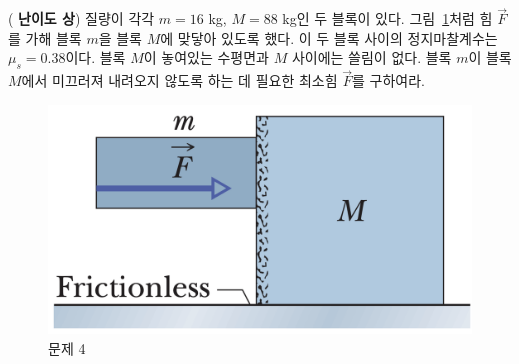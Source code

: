 \documentclass[floatfix,nofootinbib,superscriptaddress,fleqn,preprint]{revtex4}
\begin{document}
\vspace{2cm}

 (\textbf{\color{red} 난이도 상})
질량이 각각 $m=16$ kg, $M=88$ kg인 두 블록이 
있다. 그림~\ref{fig:4}처럼 힘 $\vec{F}$를 가해 블록 $m$을 블록 $M$에
맞닿아 있도록 했다. 이 두 블록 사이의 정지마찰계수는
$\mu_s=0.38$이다. 블록 $M$이 놓여있는 수평면과 $M$ 사이에는 쓸림이
없다.  블록 $m$이 블록 $M$에서 미끄러져 내려오지 않도록 하는 데 필요한
최소힘 $\vec{F}$를 구하여라. 
\begin{figure}[ht]
  \centering
\includegraphics[scale=0.3]{Qfig6-4-20220321.png}  
  \caption{문제 4}
  \label{fig:4}
\end{figure}\\
\end{document}
